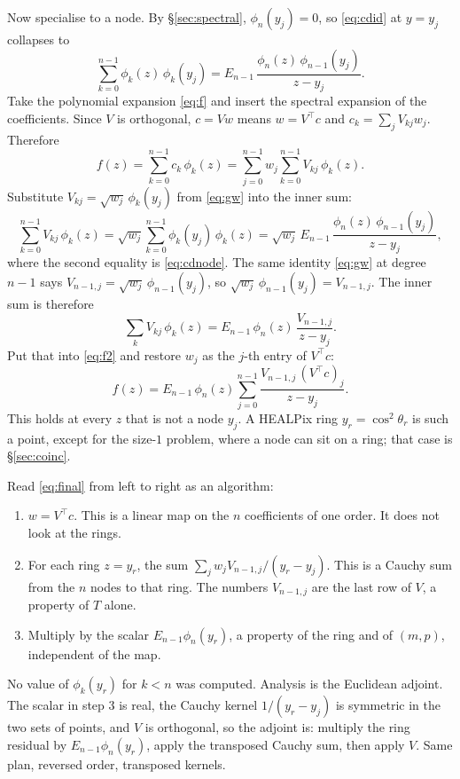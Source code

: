 \documentclass[11pt,a4paper]{article}
\numberwithin{equation}{section}
\begin{document}
Now specialise to a node. By \S\ref{sec:spectral}, $\phi_n(y_j)=0$, so \eqref{eq:cdid} at
$y=y_j$ collapses to
\begin{equation}
  \sum_{k=0}^{n-1}\phi_k(z)\,\phi_k(y_j)
  = E_{n-1}\,\frac{\phi_n(z)\,\phi_{n-1}(y_j)}{z-y_j}.
  \label{eq:cdnode}
\end{equation}
Take the polynomial expansion \eqref{eq:f} and insert the spectral expansion of the
coefficients. Since $V$ is orthogonal, $c=Vw$ means $w=V^\top c$ and
$c_k=\sum_j V_{kj} w_j$. Therefore
\begin{equation}
  f(z)
  = \sum_{k=0}^{n-1} c_k\,\phi_k(z)
  = \sum_{j=0}^{n-1} w_j \sum_{k=0}^{n-1} V_{kj}\,\phi_k(z).
  \label{eq:f2}
\end{equation}
Substitute $V_{kj}=\sqrt{w_j}\,\phi_k(y_j)$ from \eqref{eq:gw} into the inner sum:
\[
  \sum_{k=0}^{n-1} V_{kj}\,\phi_k(z)
  = \sqrt{w_j}\sum_{k=0}^{n-1}\phi_k(y_j)\,\phi_k(z)
  = \sqrt{w_j}\, E_{n-1}\,\frac{\phi_n(z)\,\phi_{n-1}(y_j)}{z-y_j},
\]
where the second equality is \eqref{eq:cdnode}.
The same identity \eqref{eq:gw} at degree $n-1$ says
$V_{n-1,j}=\sqrt{w_j}\,\phi_{n-1}(y_j)$, so
$\sqrt{w_j}\,\phi_{n-1}(y_j)=V_{n-1,j}$. The inner sum is therefore
\[
  \sum_{k} V_{kj}\,\phi_k(z)
  = E_{n-1}\,\phi_n(z)\,\frac{V_{n-1,j}}{z-y_j}.
\]
Put that into \eqref{eq:f2} and restore $w_j$ as the $j$-th entry of $V^\top c$:
\begin{equation}
  \boxed{
  f(z)
  = E_{n-1}\,\phi_n(z)
    \sum_{j=0}^{n-1}
    \frac{V_{n-1,j}\,(V^\top c)_j}{z-y_j}.
  }
  \label{eq:final}
\end{equation}
This holds at every $z$ that is not a node $y_j$. A HEALPix ring $y_r=\cos^2\theta_r$
is such a point, except for the size-$1$ problem, where a node can sit on a ring;
that case is \S\ref{sec:coinc}.

Read \eqref{eq:final} from left to right as an algorithm:
\begin{enumerate}
  \item $w=V^\top c$. This is a linear map on the $n$ coefficients of one order. It does
        not look at the rings.
  \item For each ring $z=y_r$, the sum $\sum_j w_j V_{n-1,j}/(y_r-y_j)$. This is a
        Cauchy sum from the $n$ nodes to that ring. The numbers $V_{n-1,j}$ are the
        last row of $V$, a property of $T$ alone.
  \item Multiply by the scalar $E_{n-1}\phi_n(y_r)$, a property of the ring and of
        $(m,p)$, independent of the map.
\end{enumerate}
No value of $\phi_k(y_r)$ for $k<n$ was computed. Analysis is the Euclidean adjoint.
The scalar in step 3 is real, the Cauchy kernel $1/(y_r-y_j)$ is symmetric in the
two sets of points, and $V$ is orthogonal, so the adjoint is: multiply the ring
residual by $E_{n-1}\phi_n(y_r)$, apply the transposed Cauchy sum, then apply $V$.
Same plan, reversed order, transposed kernels.
\end{document}
